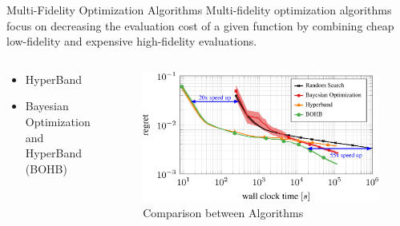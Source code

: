 \documentclass[10pt]{beamer}
\begin{document}
  \begin{frame}{Multi-Fidelity Optimization Algorithms}
    Multi-fidelity optimization algorithms focus on decreasing the evaluation cost of a given function by combining cheap low-fidelity and expensive high-fidelity evaluations.
    \begin{columns}[t]
      \begin{column}{0.55\textwidth}
        \begin{itemize}
              \item{HyperBand}
              \item{Bayesian Optimization and HyperBand (BOHB)}
        \end{itemize}
      \end{column}
      \begin{column}{0.55\textwidth}
        \begin{figure}[H]
          \centering
          \includegraphics[width=\textwidth]{images/bohb.png}
          \caption*{Comparison between Algorithms}
        \end{figure}
      \end{column}
    \end{columns}
  \end{frame}
\end{document}
